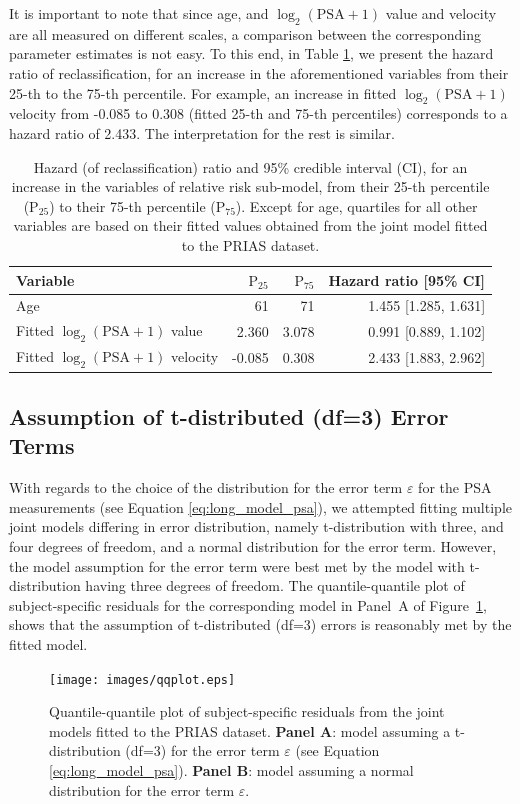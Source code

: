 It is important to note that since age, and ${\log_2 (\mbox{PSA} + 1)}$ value and velocity are all measured on different scales, a comparison between the corresponding parameter estimates is not easy. To this end, in Table \ref{tab:PSA_survival_easy}, we present the hazard ratio of reclassification, for an increase in the aforementioned variables from their 25-th to the 75-th percentile. For example, an increase in fitted $\log_2 (\mbox{PSA} + 1)$ velocity from -0.085 to 0.308 (fitted 25-th and 75-th percentiles) corresponds to a hazard ratio of 2.433. The interpretation for the rest is similar.

\begin{table}
\small\sf\centering
\caption{Hazard (of reclassification) ratio and 95\% credible interval (CI), for an increase in the variables of relative risk sub-model, from their 25-th percentile ($\mbox{P}_{25}$) to their 75-th percentile ($\mbox{P}_{75}$). Except for age, quartiles for all other variables are based on their fitted values obtained from the joint model fitted to the PRIAS dataset.}
\label{tab:PSA_survival_easy}
\begin{tabular}{lrrr}
\hline
Variable                      & $\mbox{P}_{25}$   & $\mbox{P}_{75}$ & Hazard ratio [95\% CI] \\
\hline
Age & 61 & 71 & 1.455 [1.285, 1.631] \\
Fitted $\log_2 (\mbox{PSA} + 1)$ value & 2.360 & 3.078 & 0.991 [0.889, 1.102] \\
Fitted $\log_2 (\mbox{PSA} + 1)$ velocity & -0.085 & 0.308 & 2.433 [1.883, 2.962] \\
\hline
\end{tabular}
\end{table}

\subsection{Assumption of t-distributed (df=3) Error Terms}
\label{subsec:t-dist-assumption}
With regards to the choice of the distribution for the error term $\varepsilon$ for the PSA measurements (see Equation \ref{eq:long_model_psa}), we attempted fitting multiple joint models differing in error distribution, namely t-distribution with three, and four degrees of freedom, and a normal distribution for the error term. However, the model assumption for the error term were best met by the model with t-distribution having three degrees of freedom. The quantile-quantile plot of subject-specific residuals for the corresponding model in Panel~A of Figure~\ref{fig:qqplot}, shows that the assumption of t-distributed (df=3) errors is reasonably met by the fitted model. 

\begin{figure}
\centerline{\texttt{[image: images/qqplot.eps]}}
\caption{Quantile-quantile plot of subject-specific residuals from the joint models fitted to the PRIAS dataset. \textbf{Panel A}: model assuming a t-distribution (df=3) for the error term $\varepsilon$ (see Equation \ref{eq:long_model_psa}). \textbf{Panel B}: model assuming a normal distribution for the error term $\varepsilon$.}
\label{fig:qqplot}
\end{figure}